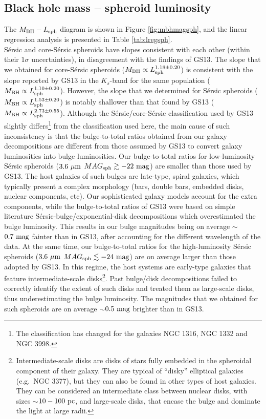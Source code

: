 \documentclass[preprint2]{emulateapj}
\begin{document}
\subsection{Black hole mass -- spheroid luminosity}
The $M_{\rm BH} - L_{\rm sph}$ diagram is shown in Figure \ref{fig:mbhmagsph}, 
and the linear regression analysis is presented in Table \ref{tab:lregsph}. \\
S\'ersic and core-S\'ersic spheroids have slopes consistent with each other (within their $1\sigma$ uncertainties), 
in disagreement with the findings of GS13. 
The slope that we obtained for core-S\'ersic spheroids ($M_{\rm BH} \propto L_{\rm sph}^{1.18 \pm 0.20}$) 
is consistent with the slope reported by GS13 in the $K_s$-band for the same population ($M_{\rm BH} \propto L_{\rm sph}^{1.10 \pm 0.20}$). 
However, the slope that we determined for S\'ersic spheroids ($M_{\rm BH} \propto L_{\rm sph}^{1.53 \pm 0.20}$) 
is notably shallower than that found by GS13 ($M_{\rm BH} \propto L_{\rm sph}^{2.73 \pm 0.55}$). 
Although the S\'ersic/core-S\'ersic classification used by GS13 slightly differs\footnote{The classification has changed for the galaxies 
NGC 1316, NGC 1332 and NGC 3998.} from the classification used here, 
the main cause of such inconsistency is that the bulge-to-total ratios obtained from our galaxy decompositions 
are different from those assumed by GS13 to convert galaxy luminosities into bulge luminosities.
Our bulge-to-total ratios for low-luminosity S\'ersic spheroids ($3.6\rm~\mu m$ $MAG_{\rm sph} \gtrsim -22 \rm~mag$) 
are smaller than those used by GS13. 
The host galaxies of such bulges are late-type, spiral galaxies, 
which typically present a complex morphology (bars, double bars, embedded disks, nuclear components, etc).
Our sophisticated galaxy models account for the extra components, 
while the bulge-to-total ratios of GS13 were based on simple literature S\'ersic-bulge/exponential-disk decompositions 
which overestimated the bulge luminosity.
This results in our bulge magnitudes being on average $\sim$$0.7\rm~mag$ fainter than in GS13, after accounting for the different wavelength of the data.
At the same time, our bulge-to-total ratios for the high-luminosity S\'ersic spheroids ($3.6\rm~\mu m$ $MAG_{\rm sph} \lesssim -24 \rm~mag$) 
are on average larger than those adopted by GS13.
In this regime, the host systems are early-type galaxies that feature intermediate-scale disks\footnote{Intermediate-scale disks are 
disks of stars fully embedded in the spheroidal component of their galaxy. 
They are typical of ``disky'' elliptical galaxies (e.g.~NGC 3377), 
but they can also be found in other types of host galaxies.
They can be considered an intermediate class between nuclear disks, with sizes $\sim$$10-100\rm~pc$, %
and large-scale disks, that encase the bulge and dominate the light at large radii.}. 
Past bulge/disk decompositions failed to correctly identify the extent of such disks and treated them as large-scale disks, 
thus underestimating the bulge luminosity.
The magnitudes that we obtained for such spheroids are on average $\sim$$0.5\rm~mag$ brighter than in GS13. 
\end{document}
